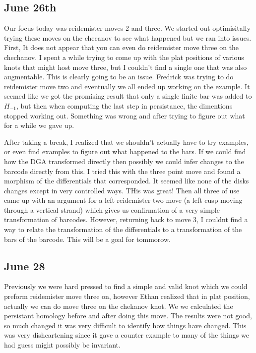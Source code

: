 \documentclass[11pt,oneside]{amsart}
\begin{document}
\subsection{June 26th}

Our focus today was reidemister moves 2 and three. We started out optimisitally trying these moves on the checanov to see what happened but we ran into issues. First, It does not appear that you can even do reidemister move three on the chechanov. I spent a while trying to come up with the plat positions of various knots that might host move three, but I couldn't find a single one that was also augmentable. This is clearly going to be an issue. Fredrick was trying to do reidemister move two and eventually we all ended up working on the example. It seemed like we got the promising result that only a single finite bar was added to $H_{-1}$, but then when computing the last step in persistance, the dimentions stopped working out. Something was wrong and after trying to figure out what for a while we gave up. 

After taking a break, I realized that we shouldn't actually have to try examples, or even find examples to figure out what happened to the bars. If we could find how the DGA transformed directly then possibly we could infer changes to the barcode directly from this. I tried this with the three point move and found a morphism of the differentials that corresponded. It seemed like none of the disks changes except in very controlled ways. THis was great! Then all three of use came up with an argument for a left reidemister two move (a left cusp moving through a vertical strand) which gives us confirmation of a very simple transformation of barcodes. However, returning back to move 3, I couldnt find a way to relate the transformation of the differentials to a transformation of the bars of the barcode. This will be a goal for tommorow. 



\subsection{June 28}

Previously we were hard pressed to find a simple and valid knot which we could preform reidemister move three on, however Ethan realized that in plat position, actually we can do move three on the chekanov knot. We we calculated the persistant homology before and after doing this move. The results were not good, so much changed it was very difficult to identify how things have changed. This was very disheartening since it gave a counter example to many of the things we had guess might possibly be invariant. 
\end{document}
